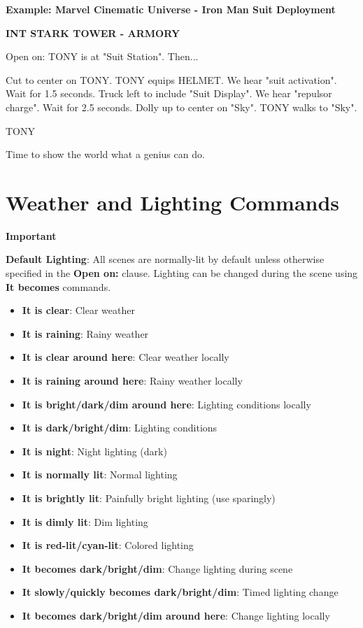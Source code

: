 \documentclass[11pt,letterpaper,oldstylefigures]{memoir}
\newcommand{\slugline}[1]{\nobreak\textbf{\MakeUppercase{#1}}\par\nobreak\vspace{1\baselineskip}}
\newcommand{\speaker}[1]{\nobreak\hspace*{0.333\textwidth}\MakeUppercase{#1}\par\nobreak\vspace{0.5\baselineskip}}
\newcommand{\dialogue}[1]{\nobreak\hspace*{0.25\textwidth}\begin{minipage}{0.5\textwidth}#1\end{minipage}\par\vspace{1\baselineskip}}
\newcommand{\stagedir}[1]{#1\par\vspace{1\baselineskip}}
\newenvironment{FountainExample}
  {\begingroup
  \ttfamily\small
   \setlength{\parindent}{0pt}
  \setlength{\parskip}{0.5em}
  \allowdisplaybreaks
  \setlength{\displaywidowpenalty}{0}
  \setlength{\widowpenalty}{0}
  \setlength{\clubpenalty}{0}
  \setlength{\interlinepenalty}{0}
}
  {\endgroup}
\newenvironment{Important}
{\begingroup
\small
\setlength{\parindent}{0pt}
\setlength{\parskip}{0.5em}
\allowdisplaybreaks
\setlength{\displaywidowpenalty}{0}
\setlength{\widowpenalty}{0}
\setlength{\clubpenalty}{0}
\setlength{\interlinepenalty}{0}
\begin{tcolorbox}[
    colback=yellow!5,
    colframe=yellow!75!black,
    boxrule=0.5pt,
    arc=2pt,
    left=0.5em,
    right=0.5em,
    top=0.25em,
    bottom=0.25em
]
\textbf{Important}
\end{tcolorbox}\par
}
{\endgroup}
\newcommand{\fountain}[1]{\textbf{#1}}
\begin{document}
\textbf{Example: Marvel Cinematic Universe - Iron Man Suit Deployment}

\begin{FountainExample}
\slugline{INT STARK TOWER - ARMORY}

\stagedir{Open on: TONY is at "Suit Station". Then...}

\stagedir{Cut to center on TONY. TONY equips HELMET. We hear "suit activation". Wait for 1.5 seconds. Truck left to include "Suit Display". We hear "repulsor charge". Wait for 2.5 seconds. Dolly up to center on "Sky". TONY walks to "Sky".}

\speaker{TONY}
\dialogue{Time to show the world what a genius can do.}
\end{FountainExample}

\section{Weather and Lighting Commands}

\begin{Important}
\textbf{Default Lighting}: All scenes are normally-lit by default unless otherwise specified in the \fountain{Open on:} clause. Lighting can be changed during the scene using \fountain{It becomes} commands.
\end{Important}

\begin{itemize}
\item \fountain{It is clear}: Clear weather
\item \fountain{It is raining}: Rainy weather
\item \fountain{It is clear around here}: Clear weather locally
\item \fountain{It is raining around here}: Rainy weather locally
\item \fountain{It is bright/dark/dim around here}: Lighting conditions locally
\item \fountain{It is dark/bright/dim}: Lighting conditions
\item \fountain{It is night}: Night lighting (dark)
\item \fountain{It is normally lit}: Normal lighting
\item \fountain{It is brightly lit}: Painfully bright lighting (use sparingly)
\item \fountain{It is dimly lit}: Dim lighting
\item \fountain{It is red-lit/cyan-lit}: Colored lighting
\item \fountain{It becomes dark/bright/dim}: Change lighting during scene
\item \fountain{It slowly/quickly becomes dark/bright/dim}: Timed lighting change
\item \fountain{It becomes dark/bright/dim around here}: Change lighting locally
\end{itemize}
\end{document}
